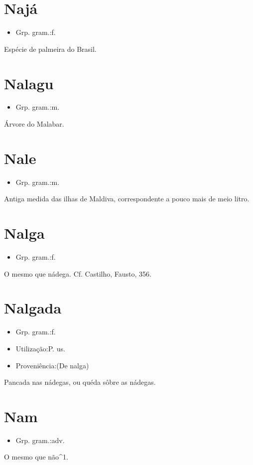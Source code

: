 \section{Najá}
\begin{itemize}
\item {Grp. gram.:f.}
\end{itemize}
Espécie de palmeira do Brasil.
\section{Nalagu}
\begin{itemize}
\item {Grp. gram.:m.}
\end{itemize}
Árvore do Malabar.
\section{Nale}
\begin{itemize}
\item {Grp. gram.:m.}
\end{itemize}
Antiga medida das ilhas de Maldiva, correspondente a pouco mais de meio litro.
\section{Nalga}
\begin{itemize}
\item {Grp. gram.:f.}
\end{itemize}
O mesmo que \textunderscore nádega\textunderscore . Cf. Castilho, \textunderscore Fausto\textunderscore , 356.
\section{Nalgada}
\begin{itemize}
\item {Grp. gram.:f.}
\end{itemize}
\begin{itemize}
\item {Utilização:P. us.}
\end{itemize}
\begin{itemize}
\item {Proveniência:(De \textunderscore nalga\textunderscore )}
\end{itemize}
Pancada nas nádegas, ou quéda sôbre as nádegas.
\section{Nam}
\begin{itemize}
\item {Grp. gram.:adv.}
\end{itemize}
O mesmo que \textunderscore não\textunderscore ^1.
